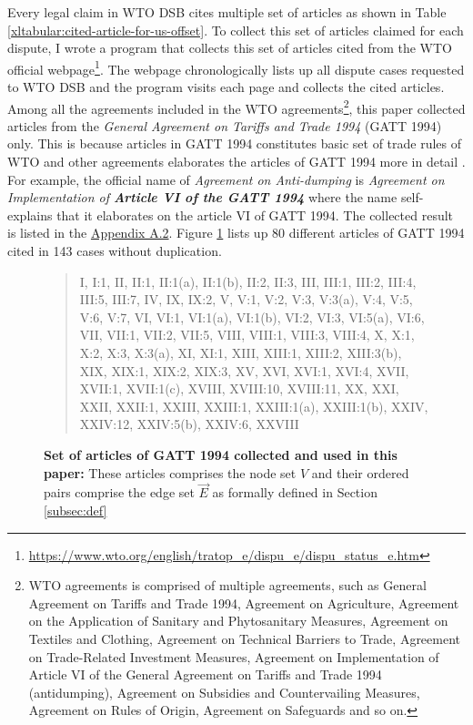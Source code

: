 Every legal claim in WTO DSB
cites multiple set of articles
as shown in Table
\ref{xltabular:cited-article-for-us-offset}.
To collect this set of articles claimed for each dispute, I wrote a program that collects this set of articles cited from the WTO official webpage\footnote{\url{https://www.wto.org/english/tratop_e/dispu_e/dispu_status_e.htm}}.
The webpage chronologically lists up all dispute cases
requested to WTO DSB and the program visits each page
and collects the cited articles. Among all the agreements included in the WTO agreements\footnote{
   WTO agreements is comprised of multiple agreements, such as
   General Agreement on Tariffs and Trade 1994,
   Agreement on Agriculture,
   Agreement on the Application of Sanitary and Phytosanitary Measures,
   Agreement on Textiles and Clothing,
   Agreement on Technical Barriers to Trade,
   Agreement on Trade-Related Investment Measures,
   Agreement on Implementation of Article VI of the General Agreement on Tariffs and Trade 1994 (antidumping),
   Agreement on Subsidies and Countervailing Measures,
   Agreement on Rules of Origin,
   Agreement on Safeguards and so on.
   },
this paper collected articles from the \textit{General Agreement on Tariffs and Trade 1994} (GATT 1994) only.
This is because articles in GATT 1994 constitutes basic set of trade rules of WTO and other agreements
elaborates the articles of GATT 1994 more in detail \citep{world1999wto}. For example, the official name of \textit{Agreement on Anti-dumping}
is \textit{Agreement on Implementation of \textbf{Article VI of the GATT 1994}}
where the name self-explains that it elaborates on the article VI of GATT 1994.
The collected result is listed in the \hyperref[sub:cited-articles-table]{Appendix A.2}. Figure \ref{fig:set-of-articles-used}
lists up 80 different articles of GATT 1994 cited in 143 cases without duplication.
 
 
\begin{figure}[t!]
   \begin{quote}
   I,
   I:1,
   II,
   II:1,
   II:1(a),
   II:1(b),
   II:2,
   II:3,
   III,
   III:1,
   III:2,
   III:4,
   III:5,
   III:7,
   IV,
   IX,
   IX:2,
   V,
   V:1,
   V:2,
   V:3,
   V:3(a),
   V:4,
   V:5,
   V:6,
   V:7,
   VI,
   VI:1,
   VI:1(a),
   VI:1(b),
   VI:2,
   VI:3,
   VI:5(a),
   VI:6,
   VII,
   VII:1,
   VII:2,
   VII:5,
   VIII,
   VIII:1,
   VIII:3,
   VIII:4,
   X,
   X:1,
   X:2,
   X:3,
   X:3(a),
   XI,
   XI:1,
   XIII,
   XIII:1,
   XIII:2,
   XIII:3(b),
   XIX,
   XIX:1,
   XIX:2,
   XIX:3,
   XV,
   XVI,
   XVI:1,
   XVI:4,
   XVII,
   XVII:1,
   XVII:1(c),
   XVIII,
   XVIII:10,
   XVIII:11,
   XX,
   XXI,
   XXII,
   XXII:1,
   XXIII,
   XXIII:1,
   XXIII:1(a),
   XXIII:1(b),
   XXIV,
   XXIV:12,
   XXIV:5(b),
   XXIV:6,
   XXVIII
   \end{quote}
   \caption{
       \textbf{
           Set of articles of GATT 1994 collected and used in this paper:
           }These articles comprises the node set $V$ and their ordered pairs comprise the edge set $\vec{E}$ as formally defined in Section \ref{subsec:def}
       }
   \label{fig:set-of-articles-used}
\end{figure}
 
